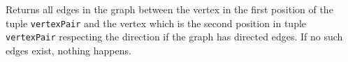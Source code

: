 \documentclass{article}
\begin{document}
\begin{description}
  Returns all edges in the graph
  between the vertex in the first position of the tuple \texttt{vertexPair} and the vertex which is the second position in tuple \texttt{vertexPair} respecting
  the direction if the graph has directed edges.
  If no such edges exist, nothing happens.
  

  
\end{description}
\end{document}
